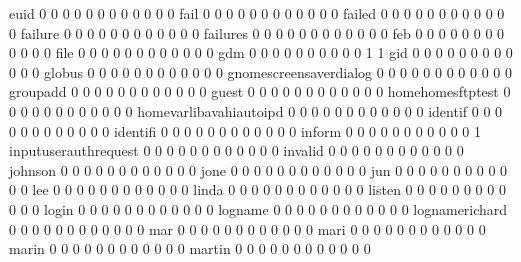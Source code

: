 \documentclass[compress,8pt]{beamer}
\begin{document}
\begin{frame}
\begin{Schunk}
  euid                                      0  0  0  0  0  0  0  0  0  0  0  0
  fail                                      0  0  0  0  0  0  0  0  0  0  0  0
  failed                                    0  0  0  0  0  0  0  0  0  0  0  0
  failure                                   0  0  0  0  0  0  0  0  0  0  0  0
  failures                                  0  0  0  0  0  0  0  0  0  0  0  0
  feb                                       0  0  0  0  0  0  0  0  0  0  0  0
  file                                      0  0  0  0  0  0  0  0  0  0  0  0
  gdm                                       0  0  0  0  0  0  0  0  0  0  1  1
  gid                                       0  0  0  0  0  0  0  0  0  0  0  0
  globus                                    0  0  0  0  0  0  0  0  0  0  0  0
  gnomescreensaverdialog                    0  0  0  0  0  0  0  0  0  0  0  0
  groupadd                                  0  0  0  0  0  0  0  0  0  0  0  0
  guest                                     0  0  0  0  0  0  0  0  0  0  0  0
  homehomesftptest                          0  0  0  0  0  0  0  0  0  0  0  0
  homevarlibavahiautoipd                    0  0  0  0  0  0  0  0  0  0  0  0
  identif                                   0  0  0  0  0  0  0  0  0  0  0  0
  identifi                                  0  0  0  0  0  0  0  0  0  0  0  0
  inform                                    0  0  0  0  0  0  0  0  0  0  0  1
  inputuserauthrequest                      0  0  0  0  0  0  0  0  0  0  0  0
  invalid                                   0  0  0  0  0  0  0  0  0  0  0  0
  johnson                                   0  0  0  0  0  0  0  0  0  0  0  0
  jone                                      0  0  0  0  0  0  0  0  0  0  0  0
  jun                                       0  0  0  0  0  0  0  0  0  0  0  0
  lee                                       0  0  0  0  0  0  0  0  0  0  0  0
  linda                                     0  0  0  0  0  0  0  0  0  0  0  0
  listen                                    0  0  0  0  0  0  0  0  0  0  0  0
  login                                     0  0  0  0  0  0  0  0  0  0  0  0
  logname                                   0  0  0  0  0  0  0  0  0  0  0  0
  lognamerichard                            0  0  0  0  0  0  0  0  0  0  0  0
  mar                                       0  0  0  0  0  0  0  0  0  0  0  0
  mari                                      0  0  0  0  0  0  0  0  0  0  0  0
  marin                                     0  0  0  0  0  0  0  0  0  0  0  0
  martin                                    0  0  0  0  0  0  0  0  0  0  0  0

\end{Schunk}
\end{frame}
\end{document}
